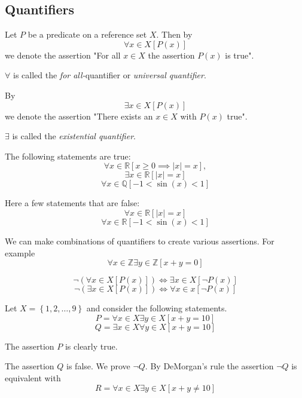 \subsection{Quantifiers}
\begin{definition}[Quantifiers]
    Let $ P $ be a predicate on a reference set $X$. Then by
    $$ \forall x \in X \left[P(x)\right] $$
    we denote the assertion "For all $ x \in X $ the assertion $ P(x) $ is true".

    $ \forall $ is called the \emph{for all-}quantifier or \emph{universal quantifier}.

    By
    $$ \exists x \in X \left[P(x)\right] $$
    we denote the assertion "There exists an $ x \in X $ with $ P(x) $ true".

    $ \exists $ is called the \emph{existential quantifier}.
\end{definition}

\begin{example}
    The following statements are true:
    $$ \forall x \in \mathbb{R} \left[x \ge 0 \implies |x| = x\right], $$
    $$ \exists x \in \mathbb{R} \left[|x| = x\right] $$
    $$ \forall x \in \mathbb{Q} \left[-1 < \sin(x) < 1\right] $$

    Here a few statements that are false:
    $$ \forall x \in \mathbb{R} \left[|x| = x\right] $$
    $$ \forall x \in \mathbb{R} \left[-1 < \sin(x) < 1\right] $$
\end{example}

\begin{example}
    We can make combinations of quantifiers to create various assertions. For example
    $$ \forall x \in \mathbb{Z} \exists y \in \mathbb{Z} \left[x + y = 0\right] $$
\end{example}

\begin{proposition}
    $$ \lnot (\forall x \in X \left[P(x)\right]) \iff \exists x \in X \left[\lnot P(x)\right]$$
    $$ \lnot (\exists x \in X \left[P(x)\right]) \iff \forall x \in x \left[\lnot P(x)\right] $$
\end{proposition}

\begin{example}
    Let $ X = \left\{1,2,\dots,9\right\} $ and consider the following statements.
    $$ P = \forall x \in X \exists y \in X \left[x+y = 10\right] $$
    $$ Q = \exists x \in X \forall y \in X \left[x+y = 10\right] $$

    The assertion $P$ is clearly true.

    The assertion $Q$ is false. We prove $ \lnot Q $. By DeMorgan's rule the assertion $ \lnot Q $ is equivalent with
    $$ R = \forall x \in X \exists y \in X \left[x+y \ne 10\right] $$
\end{example}